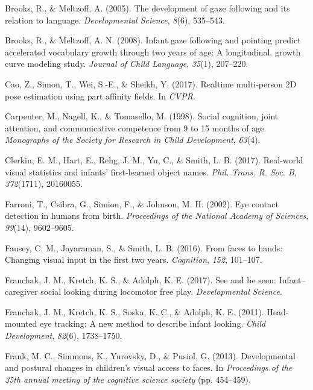 \documentclass[english,man,floatsintext]{apa6}
\begin{document}
\hypertarget{ref-brooks2005}{}
Brooks, R., \& Meltzoff, A. (2005). The development of gaze following
and its relation to language. \emph{Developmental Science}, \emph{8}(6),
535--543.

\hypertarget{ref-brooks2008}{}
Brooks, R., \& Meltzoff, A. N. (2008). Infant gaze following and
pointing predict accelerated vocabulary growth through two years of age:
A longitudinal, growth curve modeling study. \emph{Journal of Child
Language}, \emph{35}(1), 207--220.

\hypertarget{ref-cao2017realtime}{}
Cao, Z., Simon, T., Wei, S.-E., \& Sheikh, Y. (2017). Realtime
multi-person 2D pose estimation using part affinity fields. In
\emph{CVPR}.

\hypertarget{ref-carpenter1998}{}
Carpenter, M., Nagell, K., \& Tomasello, M. (1998). Social cognition,
joint attention, and communicative competence from 9 to 15 months of
age. \emph{Monographs of the Society for Research in Child Development},
\emph{63}(4).

\hypertarget{ref-clerkin2017}{}
Clerkin, E. M., Hart, E., Rehg, J. M., Yu, C., \& Smith, L. B. (2017).
Real-world visual statistics and infants' first-learned object names.
\emph{Phil. Trans. R. Soc. B}, \emph{372}(1711), 20160055.

\hypertarget{ref-farroni2002eye}{}
Farroni, T., Csibra, G., Simion, F., \& Johnson, M. H. (2002). Eye
contact detection in humans from birth. \emph{Proceedings of the
National Academy of Sciences}, \emph{99}(14), 9602--9605.

\hypertarget{ref-fausey2016}{}
Fausey, C. M., Jayaraman, S., \& Smith, L. B. (2016). From faces to
hands: Changing visual input in the first two years. \emph{Cognition},
\emph{152}, 101--107.

\hypertarget{ref-franchak2017see}{}
Franchak, J. M., Kretch, K. S., \& Adolph, K. E. (2017). See and be
seen: Infant--caregiver social looking during locomotor free play.
\emph{Developmental Science}.

\hypertarget{ref-franchak2011}{}
Franchak, J. M., Kretch, K. S., Soska, K. C., \& Adolph, K. E. (2011).
Head-mounted eye tracking: A new method to describe infant looking.
\emph{Child Development}, \emph{82}(6), 1738--1750.

\hypertarget{ref-frank2013}{}
Frank, M. C., Simmons, K., Yurovsky, D., \& Pusiol, G. (2013).
Developmental and postural changes in children's visual access to faces.
In \emph{Proceedings of the 35th annual meeting of the cognitive science
society} (pp. 454--459).
\end{document}
